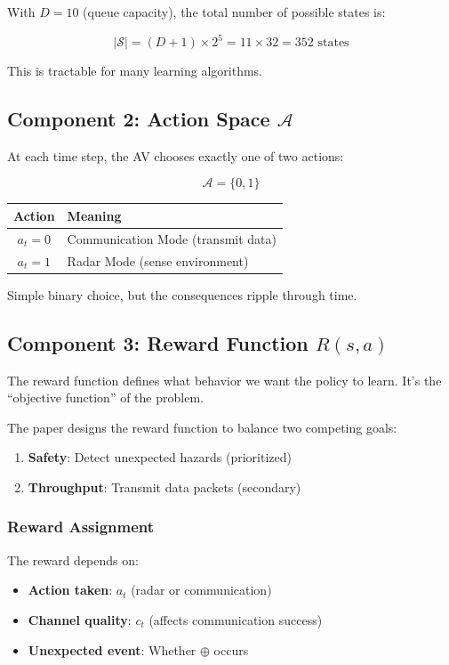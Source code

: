 \documentclass[12pt,a4paper]{article}
\begin{document}
With $D = 10$ (queue capacity), the total number of possible states is:

\[
|\mathcal{S}| = (D+1) \times 2^5 = 11 \times 32 = \boxed{352 \text{ states}}
\]

This is tractable for many learning algorithms.

\subsection{Component 2: Action Space $\mathcal{A}$}

At each time step, the AV chooses exactly one of two actions:

\[
\mathcal{A} = \{0, 1\}
\]

\begin{table}[h]
\centering
\begin{tabular}{|c|l|}
\hline
\textbf{Action} & \textbf{Meaning} \\
\hline
$a_t = 0$ & Communication Mode (transmit data) \\
\hline
$a_t = 1$ & Radar Mode (sense environment) \\
\hline
\end{tabular}
\end{table}

Simple binary choice, but the consequences ripple through time.

\subsection{Component 3: Reward Function $R(s, a)$}

The reward function defines what behavior we want the policy to learn. It's the ``objective function'' of the problem.

The paper designs the reward function to balance two competing goals:
\begin{enumerate}
    \item \textbf{Safety}: Detect unexpected hazards (prioritized)
    \item \textbf{Throughput}: Transmit data packets (secondary)
\end{enumerate}

\subsubsection{Reward Assignment}

The reward depends on:
\begin{itemize}
    \item \textbf{Action taken}: $a_t$ (radar or communication)
    \item \textbf{Channel quality}: $c_t$ (affects communication success)
    \item \textbf{Unexpected event}: Whether $\oplus$ occurs
\end{itemize}
\end{document}
